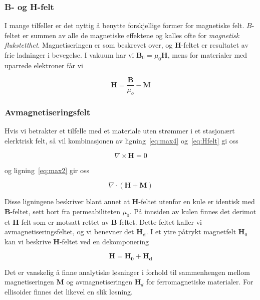 \documentclass[a4paper,11pt, twocolumn]{article}
\begin{document}
\subsubsection{B- og H-felt}
I mange tilfeller er det nyttig å benytte forskjellige former for magnetiske felt. $B$-feltet er summen av alle de magnetiske effektene og kalles ofte for \textit{magnetisk flukstetthet}. Magnetiseringen er som beskrevet over, og $\mathbf{H}$-feltet er resultatet av frie ladninger i bevegelse. 
I vakuum har vi $\mathbf{B}_0 = \mu_0 \mathbf{H}$, mens for materialer med uparrede elektroner får vi

\begin{equation}
	\mathbf{H}=\frac{\mathbf{B}}{\mu_o}-\mathbf{M}
	\label{eq:Hfelt}
\end{equation}

\subsubsection{Avmagnetiseringsfelt}
Hvis vi betrakter et tilfelle med et materiale uten strømmer i et stasjonært elerktrisk felt, så vil kombinasjonen av ligning~\ref{eq:max4} og~\ref{eq:Hfelt} gi oss

\begin{equation}
	\nabla\times\mathbf{H} = 0
	\label{eq:ampereAlternativ}
\end{equation}

og ligning~\ref{eq:max2} gir oss

\begin{equation}
	\nabla\cdot(\mathbf{H}+\mathbf{M})
	\label{eq:gaussAlternativ}
\end{equation}

Disse ligningene beskriver blant annet at $\mathbf H$-feltet utenfor en kule er identisk med $\mathbf B$-feltet, sett bort fra permeabiliteten $\mu_0$. På innsiden av kulen finnes det derimot et $\mathbf H$-felt som er motsatt rettet av $\mathbf B$-feltet. Dette feltet kaller vi avmagnetiseringsfeltet, og vi benevner det $\mathbf{H_d}$. I et ytre påtrykt magnetfelt $\mathbf H_0$ kan vi beskrive $\mathbf H$-feltet ved en dekomponering

\begin{equation}
	\mathbf{H} = \mathbf{H_0} + \mathbf{H_d}
	\label{eq:dekomponering}
\end{equation}



Det er vanskelig å finne analytiske løsninger i forhold til sammenhengen mellom magnetiseringen $\mathbf M$ og avmagnetiseringen $\mathbf H_d$ for ferromagnetiske materialer. For ellisoider finnes det likevel en slik løsning. 
\end{document}
